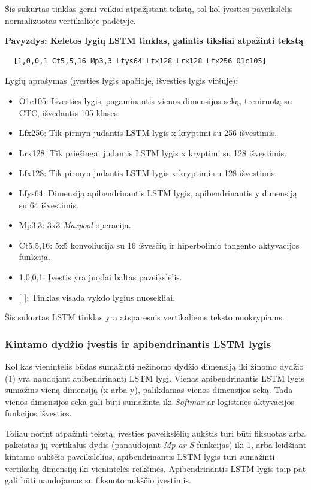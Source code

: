 \documentclass{VUMIFInfBakalaurinis}
\begin{document}
Šis sukurtas tinklas gerai veikiai atpažįstant tekstą, tol kol įvesties paveikslėlis normalizuotas vertikalioje padėtyje.

\textbf{Pavyzdys: Keletos lygių LSTM tinklas, galintis tiksliai atpažinti tekstą}

\begin{verbatim}
  [1,0,0,1 Ct5,5,16 Mp3,3 Lfys64 Lfx128 Lrx128 Lfx256 O1c105]
\end{verbatim}

Lygių aprašymas (įvesties lygis apačioje, išvesties lygis viršuje):

\begin{itemize}
  \item O1c105: Išvesties lygis, pagaminantis vienos dimensijos seką, treniruotą su CTC, išvedantis 105 klases.
  \item Lfx256: Tik pirmyn judantis LSTM lygis x kryptimi su 256 išvestimis.
  \item Lrx128: Tik priešingai judantis LSTM lygis x kryptimi su 128 išvestimis.
  \item Lfx128: Tik pirmyn judantis LSTM lygis x kryptimi su 128 išvestimis.
  \item Lfys64: Dimensiją apibendrinantis LSTM lygis, apibendrinantis y dimensiją su 64 išvestimis.
  \item Mp3,3: 3x3 \textit{Maxpool} operacija.
  \item Ct5,5,16: 5x5 konvoliucija su 16 išvesčių ir hiperbolinio tangento aktyvacijos funkcija.
  \item 1,0,0,1: Įvestis yra juodai baltas paveikslėlis.
  \item {[ ]}: Tinklas visada vykdo lygius nuosekliai.
\end{itemize}

Šis sukurtas LSTM tinklas yra atsparesnis vertikaliems teksto nuokrypiams.

\subsubsection{Kintamo dydžio įvestis ir apibendrinantis LSTM lygis}
Kol kas vienintelis būdas sumažinti nežinomo dydžio dimensiją iki žinomo dydžio (1) yra naudojant apibendrinantį LSTM lygį.
Vienas apibendrinantis LSTM lygis sumažins vieną dimensiją (x arba y), palikdamas vienos dimensijos seką.
Tada vienos dimensijos seka gali būti sumažinta iki \textit{Softmax} ar logistinės aktyvacijos funkcijos išvesties.

Toliau norint atpažinti tekstą, įvesties paveikslėlių aukštis turi būti fiksuotas arba pakeistas jų vertikalus dydis (panaudojant \textit{Mp ar S} funkcijas) iki 1,
arba leidžiant kintamo aukščio paveikslėlius, apibendrinantis LSTM lygis turi sumažinti vertikalią dimensiją iki vienintelės reikšmės.
Apibendrinantis LSTM lygis taip pat gali būti naudojamas su fiksuoto aukščio įvestimis.
\end{document}
